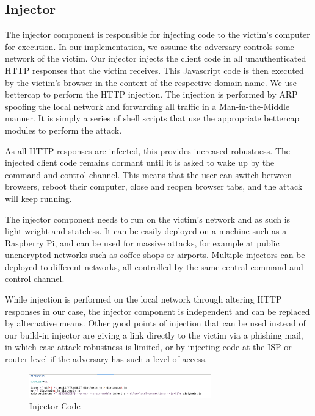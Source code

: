 \subsection{Injector}
The injector component is responsible for injecting code to the victim's
computer for execution. In our implementation, we assume the adversary controls
some network of the victim. Our injector injects the client code in all
unauthenticated HTTP responses that the victim receives. This Javascript code
is then executed by the victim's browser in the context of the respective
domain name. We use bettercap \cite{bettercap}  to perform the HTTP
injection. The injection is performed by ARP spoofing the local network and
forwarding all traffic in a Man-in-the-Middle manner. It is simply a series of
shell scripts that use the appropriate bettercap modules to perform the attack.

As all HTTP responses are infected, this provides increased robustness.
The injected client code remains dormant until it is asked to wake
up by the command-and-control channel. This means that the user can switch
between browsers, reboot their computer, close and reopen browser tabs, and the
attack will keep running.

The injector component needs to run on the victim's network and as such is
light-weight and stateless. It can be easily deployed on a machine such as a
Raspberry Pi, and can be used for massive attacks, for example at public
unencrypted networks such as coffee shops or airports. Multiple injectors can
be deployed to different networks, all controlled by the same central
command-and-control channel.

While injection is performed on the local network through altering HTTP
responses in our case, the injector component is independent and can be
replaced by alternative means. Other good points of injection that can be used
instead of our build-in injector are giving a link directly to the victim via a
phishing mail, in which case attack robustness is limited, or by injecting code
at the ISP or router level if the adversary has such a level of access.


\begin{figure}[H] \caption{Injector Code} \centering
\includegraphics[width=0.7\textwidth]{diagrams/injector.png}\end{figure}



